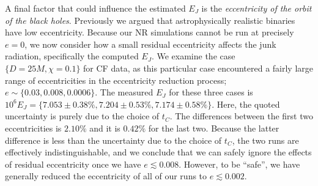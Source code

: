 A final factor that could influence the estimated $E_J$ is the
{\it eccentricity of the orbit of the black holes}. Previously we argued
that astrophysically realistic binaries have
low eccentricity. Because our NR simulations cannot be run at precisely $e=0$, we now consider how a small residual eccentricity affects the junk radiation, specifically the computed $E_J$. We examine the case $\{D=25M,\chi=0.1\}$
for CF data, as this particular case encountered a fairly large range of
eccentricities in the eccentricity reduction process;
$e\sim\{0.03,0.008,0.0006\}$. The measured $E_J$ for these three cases
is $10^6E_J=\{7.053\pm0.38\%, 7.204\pm0.53\%, 7.174\pm0.58\%\}$. Here,
the quoted uncertainty is purely due to the choice of $t_C$. The
differences between the first two eccentricities is $2.10\%$ and it is
$0.42\%$ for the last two. Because the latter difference is less than
the uncertainty due to the choice of $t_C$, the two runs are
effectively indistinguishable, and we conclude that we can safely
ignore the effects of residual eccentricity once we have $e\lesssim
0.008$. However, to be ``safe'', we have generally reduced the
eccentricity of all of our runs to $e\lesssim 0.002$.

